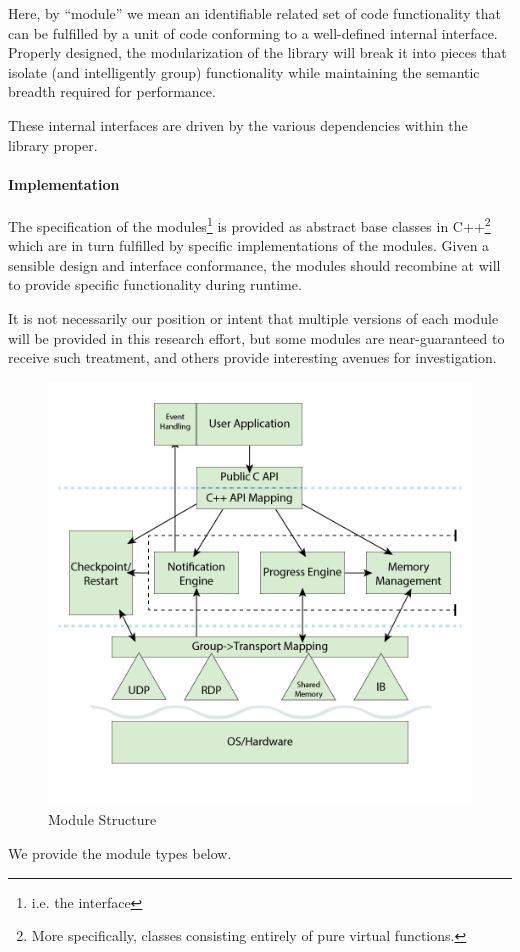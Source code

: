 \documentclass{article}
\begin{document}
Here, by ``module'' we mean an identifiable related set of code functionality that can be fulfilled by a unit of code conforming to a well-defined internal interface.  Properly designed, the modularization of the library will break it into pieces that isolate (and intelligently group) functionality while maintaining the semantic breadth required for performance.

These internal interfaces are driven by the various dependencies within the library proper.

\paragraph{Implementation} The specification of the modules\footnote{i.e. the interface} is provided as abstract base classes in C++\footnote{More specifically, classes consisting entirely of pure virtual functions.} which are in turn fulfilled by specific implementations of the modules.  Given a sensible design and interface conformance, the modules should recombine at will to provide specific functionality during runtime.

It is not necessarily our position or intent that multiple versions of each module will be provided in this research effort, but some modules are near-guaranteed to receive such treatment, and others provide interesting avenues for investigation.

\begin{figure}
	\includegraphics[width=\linewidth]{module}
	\caption{Module Structure}
	\label{fig:module}
\end{figure}
We provide the module types below.
\end{document}
